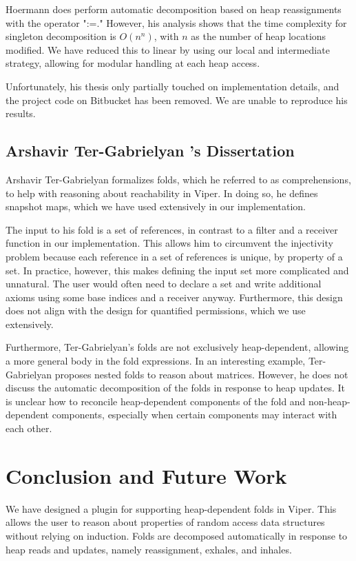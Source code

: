 \documentclass[msc,oneside]{ubcthesis}
\theoremstyle{definition}
\begin{document}
Hoermann does perform automatic decomposition based on heap reassignments with the operator ":=." However, his analysis shows that the time complexity for singleton decomposition is $O(n^n)$, with $n$ as the number of heap locations modified. We have reduced this to linear by using our local and intermediate strategy, allowing for modular handling at each heap access. 

Unfortunately, his thesis only partially touched on implementation details, and the project code on Bitbucket has been removed. We are unable to reproduce his results.

\section{Arshavir Ter-Gabrielyan 's Dissertation}
Arshavir Ter-Gabrielyan formalizes folds, which he referred to as comprehensions, to help with reasoning about reachability in Viper. In doing so, he defines snapshot maps, which we have used extensively in our implementation.

The input to his fold is a set of references, in contrast to a filter and a receiver function in our implementation. This allows him to circumvent the injectivity problem because each reference in a set of references is unique, by property of a set. In practice, however, this makes defining the input set more complicated and unnatural. The user would often need to declare a set and write additional axioms using some base indices and a receiver anyway. Furthermore, this design does not align with the design for quantified permissions, which we use extensively. 

Furthermore, Ter-Gabrielyan's folds are not exclusively heap-dependent, allowing a more general body in the fold expressions. In an interesting example, Ter-Gabrielyan proposes nested folds to reason about matrices. However, he does not discuss the automatic decomposition of the folds in response to heap updates. It is unclear how to reconcile heap-dependent components of the fold and non-heap-dependent components, especially when certain components may interact with each other. 

\chapter{Conclusion and Future Work}
We have designed a plugin for supporting heap-dependent folds in Viper. This allows the user to reason about properties of random access data structures without relying on induction. Folds are decomposed automatically in response to heap reads and updates, namely reassignment, exhales, and inhales. 
\end{document}
